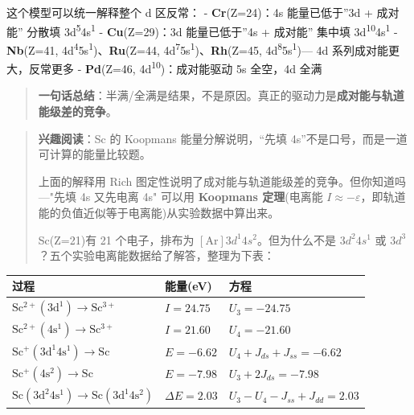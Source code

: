 这个模型可以统一解释整个 d 区反常：
- \textbf{Cr}(Z=24)：4s 能量已低于''3d + 成对能'' \箭 分散填 3d\textsuperscript{5}4s\textsuperscript{1}
- \textbf{Cu}(Z=29)：3d 能量已低于''4s + 成对能'' \箭 集中填 3d\textsuperscript{10}4s\textsuperscript{1}
- \textbf{Nb}(Z=41, 4d\textsuperscript{4}5s\textsuperscript{1})、\textbf{Ru}(Z=44, 4d\textsuperscript{7}5s\textsuperscript{1})、\textbf{Rh}(Z=45, 4d\textsuperscript{8}5s\textsuperscript{1})--- 4d 系列成对能更大，反常更多
- \textbf{Pd}(Z=46, 4d\textsuperscript{10})：成对能驱动 \箭 5s 全空，4d 全满

\begin{quote}
\textbf{一句话总结}：半满/全满是结果，不是原因。真正的驱动力是\textbf{成对能与轨道能级差的竞争}。
\end{quote}

\begin{quote}
\textbf{兴趣阅读}：Sc 的 Koopmans 能量分解说明，``先填 4s''不是口号，而是一道可计算的能量比较题。

上面的解释用 Rich 图定性说明了成对能与轨道能级差的竞争。但你知道吗---"先填 4s 又先电离 4s" 可以用 \textbf{Koopmans 定理}(电离能 \(I \approx -\varepsilon\)，即轨道能的负值近似等于电离能)从实验数据中算出来。

Sc(Z=21)有 21 个电子，排布为 \([\mathrm{Ar}]3d^1 4s^2\)。但为什么不是 \(3d^2 4s^1\) 或 \(3d^3\)？五个实验电离能数据给了解答，整理为下表：
\end{quote}

{\def\LTcaptype{none} %
\begin{longtable}[]{@{}
  >{\raggedright\arraybackslash}p{}
  >{\centering\arraybackslash}p{}
  >{\raggedright\arraybackslash}p{}@{}}
\toprule\noalign{}
\begin{minipage}[b]{\linewidth}\raggedright
过程
\end{minipage} & \begin{minipage}[b]{\linewidth}\centering
能量(eV)
\end{minipage} & \begin{minipage}[b]{\linewidth}\raggedright
方程
\end{minipage} \\
\midrule\noalign{}
\endhead
\bottomrule\noalign{}
\endlastfoot
\(\mathrm{Sc^{2+}(3d^1) \rightarrow Sc^{3+}}\) & \(I = 24.75\) & \(U_3 = -24.75\) \\
\(\mathrm{Sc^{2+}(4s^1) \rightarrow Sc^{3+}}\) & \(I = 21.60\) & \(U_4 = -21.60\) \\
\(\mathrm{Sc^{+}(3d^1 4s^1) \rightarrow Sc}\) & \(E = -6.62\) & \(U_4 + J_{ds} + J_{ss} = -6.62\) \\
\(\mathrm{Sc^{+}(4s^2) \rightarrow Sc}\) & \(E = -7.98\) & \(U_3 + 2J_{ds} = -7.98\) \\
\(\mathrm{Sc(3d^2 4s^1) \rightarrow Sc(3d^1 4s^2)}\) & \(\Delta E = 2.03\) & \(U_3 - U_4 - J_{ss} + J_{dd} = 2.03\) \\
\end{longtable}
}

